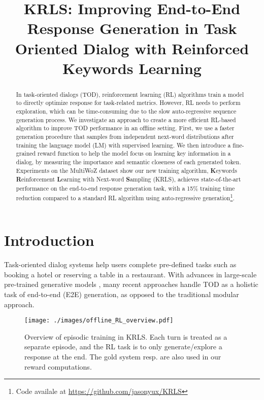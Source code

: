 \title{KRLS: Improving End-to-End Response Generation in Task Oriented Dialog with Reinforced Keywords Learning}



\maketitle
\begin{abstract}
In task-oriented dialogs (TOD), reinforcement learning (RL) algorithms train a model to directly optimize response for task-related metrics.
However, RL needs to perform exploration, which can be time-consuming due to the slow auto-regressive sequence generation process. 
We investigate an approach to create a more efficient RL-based algorithm to improve TOD performance in an offline setting.
First, we use a faster generation procedure that samples from independent next-word distributions after training the language model (LM) with supervised learning.
We then introduce a fine-grained reward function to help the model focus on learning key information in a dialog, by measuring the importance and semantic closeness of each generated token.
Experiments on the MultiWoZ dataset show our new training algorithm, \textbf{K}eywords \textbf{R}einforcement \textbf{L}earning with Next-word \textbf{S}ampling (KRLS), achieves state-of-the-art performance on the end-to-end response generation task, with a 15\% training time reduction compared to a standard RL algorithm using auto-regressive generation\footnote{Code availale at \href{https://github.com/jasonyux/KRLS}{https://github.com/jasonyux/KRLS}}.
\end{abstract}

\section{Introduction}

Task-oriented dialog systems help users complete pre-defined tasks such as booking a hotel or reserving a table in a restaurant.
With advances in large-scale pre-trained generative models \cite{GPT3,T5,dialoGPT,godel}, many recent approaches \cite{DBLP:journals/corr/abs-1910-03756,NEURIPS2020_e9462095,ubar,mttod,galaxy} handle TOD as a holistic task of end-to-end (E2E) generation, as opposed to the traditional modular approach. 
\begin{figure}[!h]
  \centering
  \texttt{[image: ./images/offline\_RL\_overview.pdf]}
  \caption{Overview of episodic training in KRLS. Each turn is treated as a separate episode, and the RL task is to only generate/explore a response at the end. The gold system resp. are also used in our reward computations.}
  \label{fig:offline_RL_overview}
\end{figure}

